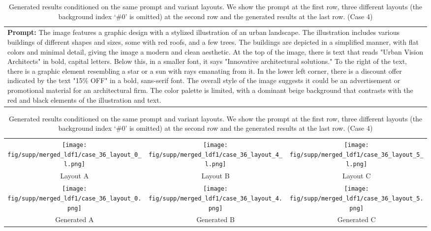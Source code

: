 \begin{table}[htbp]
    \centering
    \begin{tabular}{p{\textwidth}}
    \midrule
    \textbf{Prompt:} \small{The image features a graphic design with a stylized illustration of an urban landscape. The illustration includes various buildings of different shapes and sizes, some with red roofs, and a few trees. The buildings are depicted in a simplified manner, with flat colors and minimal detail, giving the image a modern and clean aesthetic. At the top of the image, there is text that reads "Urban Vision Architects" in bold, capital letters. Below this, in a smaller font, it says "Innovative architectural solutions." To the right of the text, there is a graphic element resembling a star or a sun with rays emanating from it. In the lower left corner, there is a discount offer indicated by the text "15\% OFF" in a bold, sans-serif font. The overall style of the image suggests it could be an advertisement or promotional material for an architectural firm. The color palette is limited, with a dominant beige background that contrasts with the red and black elements of the illustration and text.}
    \vspace{1em}
    \end{tabular}
    \begin{tabular}{ccc}
        \texttt{[image: fig/supp/merged\_ldf1/case\_36\_layout\_0\_l.png]} &
        \texttt{[image: fig/supp/merged\_ldf1/case\_36\_layout\_4\_l.png]} &
        \texttt{[image: fig/supp/merged\_ldf1/case\_36\_layout\_5\_l.png]} \\
        \small{Layout A} & \small{Layout B} & \small{Layout C} \\[1em]
        \texttt{[image: fig/supp/merged\_ldf1/case\_36\_layout\_0.png]} &
        \texttt{[image: fig/supp/merged\_ldf1/case\_36\_layout\_4.png]} &
        \texttt{[image: fig/supp/merged\_ldf1/case\_36\_layout\_5.png]} \\
        \small{Generated A} & \small{Generated B} & \small{Generated C} \\
        \bottomrule
    \end{tabular}
    
    \caption{Generated results conditioned on the same prompt and variant layouts. We show the prompt at the first row, three different layouts (the background index `\#0' is omitted) at the second row and the generated results at the last row. (Case 4)}
    \label{tab:variant_layout4}
\end{table}


